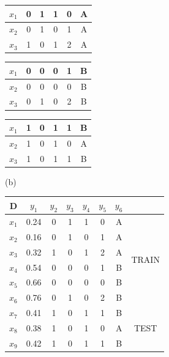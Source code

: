 \documentclass[a4paper,12pt]{article} %
\begin{document}
\begin{enumerate}
\begin{table}[H]
    \begin{minipage}[b]{0.3\linewidth}
    \centering
    \begin{tabular}{cccccc}
        $x_1$ & 0 & 1 & 1 & 0 & A \\ \hline
        $x_2$ & 0 & 1 & 0 & 1 & A \\ \hline
        $x_3$ & 1 & 0 & 1 & 2 & A
        \end{tabular}
    \end{minipage}
    \hfill
    \begin{minipage}[b]{0.3\linewidth}
    \centering
    \begin{tabular}{cccccc}
        $x_1$ & 0 & 0 & 0 & 1 & B \\ \hline
        $x_2$ & 0 & 0 & 0 & 0 & B \\ \hline
        $x_3$ & 0 & 1 & 0 & 2 & B
        \end{tabular}
    \end{minipage}
    \hfill
    \begin{minipage}[b]{0.3\linewidth}
    \centering
    \begin{tabular}{cccccc}
        $x_1$ & 1 & 0 & 1 & 1 & B \\ \hline
        $x_2$ & 1 & 0 & 1 & 0 & A \\ \hline
        $x_3$ & 1 & 0 & 1 & 1 & B
        \end{tabular}
    \end{minipage}
    \hfill

\end{table}

(b)

\begin{table}[H]
    \centering
    \begin{tabular}{cccccccc}
    D  & $y_1$   & $y_2$ & $y_3$ & $y_4$ & $y_5$ & $y_6$ &         \\ \hline
    $x_1$ & 0.24 & 0  & 1  & 1  & 0  & A  & \multirow{6}{*}{TRAIN} \\
    $x_2$ & 0.16 & 0  & 1  & 0  & 1  & A  &                        \\
    $x_3$ & 0.32 & 1  & 0  & 1  & 2  & A  &                        \\
    $x_4$ & 0.54 & 0  & 0  & 0  & 1  & B  &                        \\
    $x_5$ & 0.66 & 0  & 0  & 0  & 0  & B  &                        \\
    $x_6$ & 0.76 & 0  & 1  & 0  & 2  & B  &                        \\ \hline
    $x_7$ & 0.41 & 1  & 0  & 1  & 1  & B  & \multirow{3}{*}{TEST}  \\
    $x_8$ & 0.38 & 1  & 0  & 1  & 0  & A  &                        \\
    $x_9$ & 0.42 & 1  & 0  & 1  & 1  & B  &                       
    \end{tabular}
\end{table}


\end{enumerate}
\end{document}
